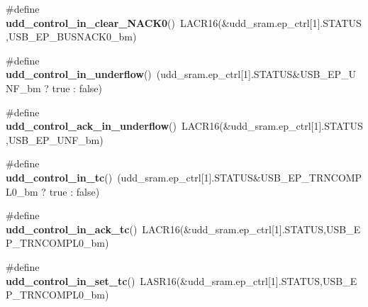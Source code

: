 \begin{DoxyCompactItemize}
\item 
\hypertarget{group__udd__xmega__usb__group_gacbb082c115c3a3256e401344ec10c790}{\#define {\bfseries udd\-\_\-control\-\_\-in\-\_\-clear\-\_\-\-N\-A\-C\-K0}()~L\-A\-C\-R16(\&udd\-\_\-sram.\-ep\-\_\-ctrl\mbox{[}1\mbox{]}.S\-T\-A\-T\-U\-S,U\-S\-B\-\_\-\-E\-P\-\_\-\-B\-U\-S\-N\-A\-C\-K0\-\_\-bm)}\label{group__udd__xmega__usb__group_gacbb082c115c3a3256e401344ec10c790}

\item 
\hypertarget{group__udd__xmega__usb__group_ga25b6d94b1ac444adeee6a82c6319170b}{\#define {\bfseries udd\-\_\-control\-\_\-in\-\_\-underflow}()~(udd\-\_\-sram.\-ep\-\_\-ctrl\mbox{[}1\mbox{]}.S\-T\-A\-T\-U\-S\&U\-S\-B\-\_\-\-E\-P\-\_\-\-U\-N\-F\-\_\-bm ? true \-: false)}\label{group__udd__xmega__usb__group_ga25b6d94b1ac444adeee6a82c6319170b}

\item 
\hypertarget{group__udd__xmega__usb__group_gaf8e1abf451481ff3e8fd366559bf44d6}{\#define {\bfseries udd\-\_\-control\-\_\-ack\-\_\-in\-\_\-underflow}()~L\-A\-C\-R16(\&udd\-\_\-sram.\-ep\-\_\-ctrl\mbox{[}1\mbox{]}.S\-T\-A\-T\-U\-S,U\-S\-B\-\_\-\-E\-P\-\_\-\-U\-N\-F\-\_\-bm)}\label{group__udd__xmega__usb__group_gaf8e1abf451481ff3e8fd366559bf44d6}

\item 
\hypertarget{group__udd__xmega__usb__group_ga2c8db665238eaed5b930d028754008c4}{\#define {\bfseries udd\-\_\-control\-\_\-in\-\_\-tc}()~(udd\-\_\-sram.\-ep\-\_\-ctrl\mbox{[}1\mbox{]}.S\-T\-A\-T\-U\-S\&U\-S\-B\-\_\-\-E\-P\-\_\-\-T\-R\-N\-C\-O\-M\-P\-L0\-\_\-bm ? true \-: false)}\label{group__udd__xmega__usb__group_ga2c8db665238eaed5b930d028754008c4}

\item 
\hypertarget{group__udd__xmega__usb__group_ga8c75e311c52b06da4100ab05e49f6f3b}{\#define {\bfseries udd\-\_\-control\-\_\-in\-\_\-ack\-\_\-tc}()~L\-A\-C\-R16(\&udd\-\_\-sram.\-ep\-\_\-ctrl\mbox{[}1\mbox{]}.S\-T\-A\-T\-U\-S,U\-S\-B\-\_\-\-E\-P\-\_\-\-T\-R\-N\-C\-O\-M\-P\-L0\-\_\-bm)}\label{group__udd__xmega__usb__group_ga8c75e311c52b06da4100ab05e49f6f3b}

\item 
\hypertarget{group__udd__xmega__usb__group_ga901dda8d1264e823c13f6200d4439d44}{\#define {\bfseries udd\-\_\-control\-\_\-in\-\_\-set\-\_\-tc}()~L\-A\-S\-R16(\&udd\-\_\-sram.\-ep\-\_\-ctrl\mbox{[}1\mbox{]}.S\-T\-A\-T\-U\-S,U\-S\-B\-\_\-\-E\-P\-\_\-\-T\-R\-N\-C\-O\-M\-P\-L0\-\_\-bm)}\label{group__udd__xmega__usb__group_ga901dda8d1264e823c13f6200d4439d44}


\end{DoxyCompactItemize}
